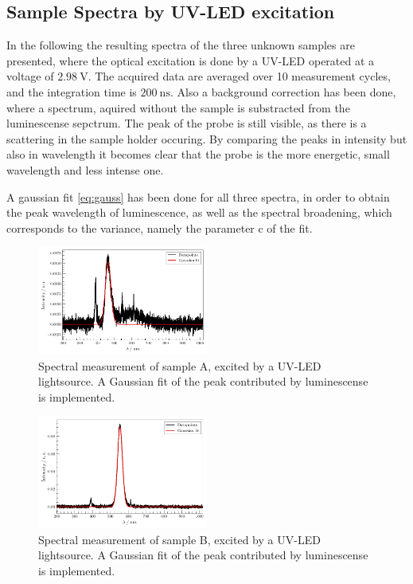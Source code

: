 \subsection{Sample Spectra by UV-LED excitation}
\label{sec:samp_LED}

In the following the resulting spectra of the three unknown samples are presented, where the optical excitation is done by a UV-LED operated at a voltage of $\SI{2.98}{\volt}$.
The acquired data are averaged over 10 measurement cycles, and the integration time is $\SI{200}{\nano\second}$.
Also a background correction has been done, where a spectrum, aquired without the sample is substracted from the luminescense sepctrum.
The peak of the probe is still visible, as there is a scattering in the sample holder occuring.
By comparing the peaks in intensity but also in wavelength it becomes clear that the probe is the more energetic, small wavelength and less intense one.


A gaussian fit \ref{eq:gauss} has been done for all three spectra, in order to obtain the peak wavelength of luminescence, as well as the spectral broadening, which corresponds to the variance, namely the parameter c of the fit.

\begin{figure}
    \captionsetup{width=0.9\linewidth}
    \includegraphics[width=0.5\textwidth]{plots/Samp_A_D.pdf}
  \caption{Spectral measurement of sample A, excited by a UV-LED lightsource. A Gaussian fit of the peak contributed by luminescense is implemented.}
    \label{fig:Samp_A_D}
\end{figure}

\begin{figure}
    \captionsetup{width=0.9\linewidth}
    \includegraphics[width=0.5\textwidth]{plots/Samp_B_D.pdf}
  \caption{Spectral measurement of sample B, excited by a UV-LED lightsource. A Gaussian fit of the peak contributed by luminescense is implemented.}
    \label{fig:Samp_B_D}
\end{figure}

